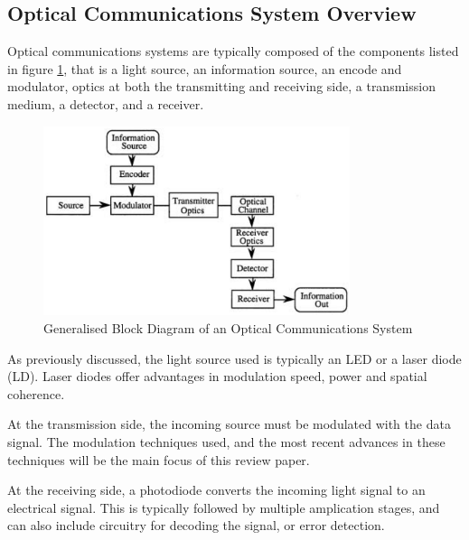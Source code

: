 \subsection{Optical Communications System Overview}

Optical communications systems are typically composed of the components listed
in figure \ref{fig:overview}, that is a light source, an information source, an
encode and modulator, optics at both the transmitting and receiving side, a
transmission medium, a detector, and a receiver.

\begin{figure}[H]
	\centering
	\includegraphics[width=0.8\textwidth]{images/optcommsblock}
	\caption{Generalised Block Diagram of an Optical Communications System
	\cite{mickelson_2003}}
	\label{fig:overview}
\end{figure}

\par As previously discussed, the light source used is typically an LED or a laser
diode (LD). Laser diodes offer advantages in modulation speed, power and spatial
coherence\cite{alwayn_2004}.

\par At the transmission side, the incoming source must be modulated with the data
signal. The modulation techniques used, and the most recent advances in these
techniques will be the main focus of this review paper.

\par At the receiving side, a photodiode converts the incoming light signal to
an electrical signal. This is typically followed by multiple amplication stages,
and can also include circuitry for decoding the signal, or error
detection\cite{alwayn_2004}.
